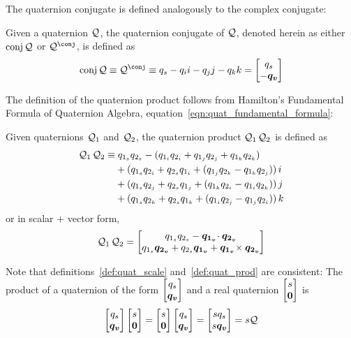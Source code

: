 The quaternion conjugate is defined analogously to the complex conjugate:
\begin{definition}\label{def:quat_conj}
Given a quaternion $\mathcal{Q}$,
the quaternion conjugate of $\mathcal{Q}$,
denoted herein as either $\operatorname{conj} \mathcal{Q}$ or $\quatconj Q$,
is defined as
\begin{equation}
\conjop{\quat Q} \equiv
\quatconj Q \equiv q_s - q_i i - q_j j - q_k k
  = \quatsv {q_s} {- \vect{q_v}}
\label{eqn:quat_conj_def}
\end{equation}
\end{definition}

The definition of the quaternion product follows from
Hamilton's Fundamental Formula of Quaternion Algebra,
equation~\eqref{eqn:quat_fundamental_formula}:
\begin{definition}\label{def:quat_prod}
Given quaternions $\mathcal{Q}_1$ and $\mathcal{Q}_2$,
the quaternion product $\QxQ{\quat{Q}_1}{\quat{Q}_2}$ is defined as
\begin{equation}
\begin{split}
\QxQ{\quat{Q}_1}{\quat{Q}_2} \equiv&\;
        q_{1_s} q_{2_s} -
        (q_{1_i} q_{2_i} + q_{1_j} q_{2_j} + q_{1_k} q_{2_k}) \\
    &+ (q_{1_s} q_{2_i}  + q_{2_s} q_{1_i} +
        (q_{1_j} q_{2_k} - q_{1_k} q_{2_j}))\,i \\
    &+ (q_{1_s} q_{2_j}  + q_{2_s} q_{1_j} +
        (q_{1_k} q_{2_i} - q_{1_i} q_{2_k}))\,j \\
    &+ (q_{1_s} q_{2_k}  + q_{2_s} q_{1_k} +
        (q_{1_i} q_{2_j} - q_{1_j} q_{2_i}))\,k
  \end{split}  \label{eqn:quat_prod_explicit}
\end{equation}
or in scalar $+$ vector form,
\begin{equation}
\QxQ{\quat{Q}_1}{\quat{Q}_2} = 
  \quatsv
    {q_{1_s} q_{2_s} - \vect{q_{1_v}} \!\cdot \vect{q_{2_v}}}
    {q_{1_s} \vect{q_{2_v}} +
     q_{2_s} \vect{q_{1_v}} +
     \vect{q_{1_v}} \!\times \vect{q_{2_v}}}
  \label{eqn:quat_prod_short}
\end{equation}
\end{definition}

Note that definitions~\ref{def:quat_scale} and~\ref{def:quat_prod} are
consistent: The product of a quaternion of the form
$\quatsv {q_s}{\vect{q_v}}$ and a real quaternion
$\quatsv {s}{\vect 0}$ is
\begin{equation*}
  \QxQ{\quatsv {q_s}{\vect{q_v}}}{\quatsv {s}{\vect 0}}
  = \QxQ{\quatsv {s}{\vect 0}}{\quatsv {q_s}{\vect{q_v}}}
  = \quatsv {s q_s}{s \vect {q_v}} = s \quat Q
\end{equation*}

